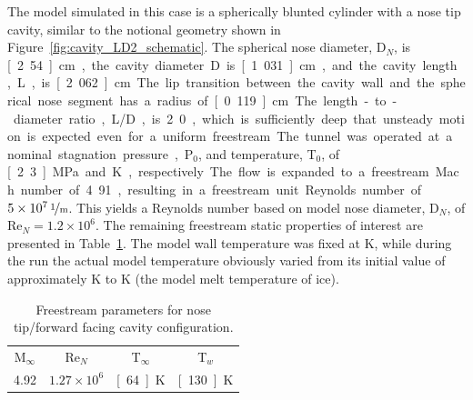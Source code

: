 The model simulated in this case is a spherically blunted cylinder with a nose tip cavity, similar to the notional geometry shown in Figure~\ref{fig:cavity_LD2_schematic}.  The spherical nose diameter, D$_N$, is \unit[2.54]{cm}, the cavity diameter D is \unit[1.031]{cm}, and the cavity length, L, is \unit[2.062]{cm}. The lip transition between the cavity wall and the spherical nose segment has a radius of \unit[0.119]{cm}.  The length-to-diameter ratio, L/D, is 2.0, which is sufficiently deep that unsteady motion is expected even for a uniform freestream.

The tunnel was operated at a nominal stagnation pressure, P$_0$, and temperature, T$_0$, of \unit[2.3]{MPa} and \unit[370]{K}, respectively.  The flow is expanded to a freestream Mach number of 4.91, resulting in a freestream unit Reynolds number of $\unitfrac[5\times 10^7]{1}{m}$.  This yields a Reynolds number based on model nose diameter, D$_N$, of Re$_N=1.2\times 10^6$.  The remaining freestream static properties of interest are presented in Table~\ref{table:cavity_LD2_freestream-parameters}.  The model wall temperature was fixed at \unit[130]{K}, while during the run the actual model temperature obviously varied from its initial value of approximately \unit[100]{K} to \unit[273]{K} (the model melt temperature of ice).
\begin{table}[hbtp]
  \begin{center}
    \caption[Freestream parameters for nose tip/forward facing cavity configuration.]{Freestream parameters for nose tip/forward facing cavity configuration.\label{table:cavity_LD2_freestream-parameters}}
    \vspace{1em}
    \begin{tabular}{cccc} \hline \hline
      M$_\infty$ & Re$_N$            & T$_\infty$    & T$_w$          \\
      4.92       & $1.27\times 10^6$ & \unit[64.]{K} & \unit[130.]{K} \\ \hline
    \end{tabular}
  \end{center}
\end{table}

\clearpage
